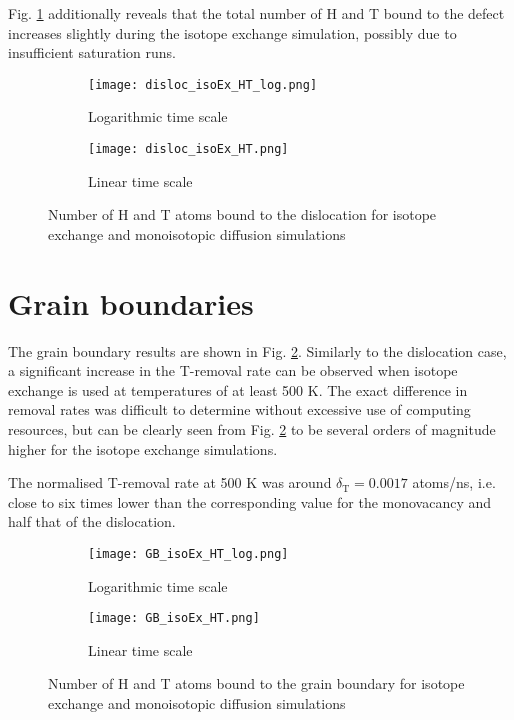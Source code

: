 Fig. \ref{Fig:disloc_results} additionally reveals that the total number of H and T bound to the defect increases slightly during the isotope exchange simulation, possibly due to insufficient saturation runs. 

\vspace{15mm} 

\begin{figure}[!ht]
\begin{subfigure}{.5\textwidth}
  \centering
 \texttt{[image: disloc\_isoEx\_HT\_log.png]}  
  \caption{Logarithmic time scale}
\end{subfigure}
\begin{subfigure}{.5\textwidth}
  \centering
  \texttt{[image: disloc\_isoEx\_HT.png]}  
  \caption{Linear time scale}
\end{subfigure}
   \caption{Number of H and T atoms bound to the dislocation for isotope exchange and monoisotopic diffusion simulations}
   \label{Fig:disloc_results} 
\end{figure}

\pagebreak

\section{Grain boundaries}
The grain boundary results are shown in Fig. \ref{Fig:GB_results}. 
Similarly to the dislocation case, a significant increase in the T-removal rate can be observed when isotope exchange is used at temperatures of at least 500 K.
The exact difference in removal rates was difficult to determine without excessive use of computing resources, but can be clearly seen from Fig. \ref{Fig:GB_results} to be several orders of magnitude higher for the isotope exchange simulations.

The normalised T-removal rate at 500 K was around $\delta_{\text{T}} = 0.0017$ atoms/ns, i.e. close to six times lower than the corresponding value for the monovacancy and half that of the dislocation.

\begin{figure}[!ht]
\begin{subfigure}{.5\textwidth}
  \centering
 \texttt{[image: GB\_isoEx\_HT\_log.png]}  
  \caption{Logarithmic time scale}
\end{subfigure}
\begin{subfigure}{.5\textwidth}
  \centering
  \texttt{[image: GB\_isoEx\_HT.png]}  
  \caption{Linear time scale}
\end{subfigure}
   \caption{Number of H and T atoms bound to the grain boundary for isotope exchange and monoisotopic diffusion simulations}
   \label{Fig:GB_results} 
\end{figure}


